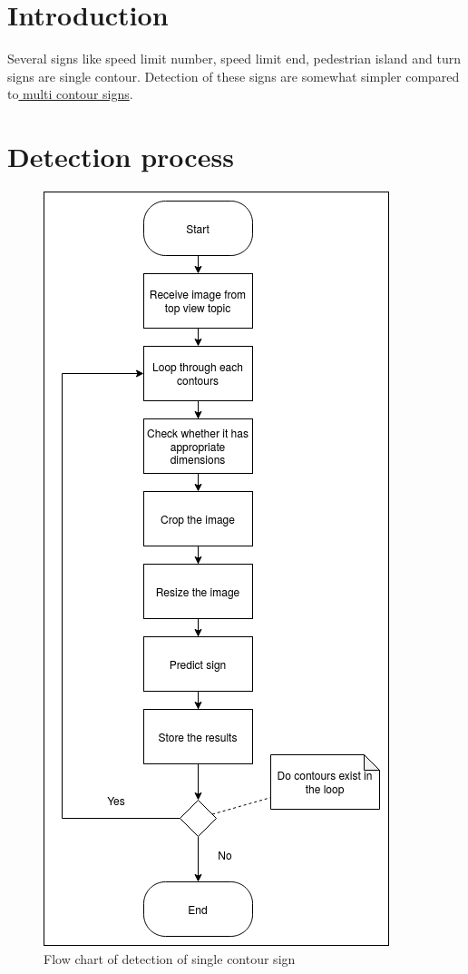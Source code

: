 \section{Introduction}
Several signs like speed limit number, speed limit end, pedestrian island and turn signs are single contour. Detection of these signs are somewhat simpler compared to\hyperref[chap:MultiContour]{ multi contour signs}.

\section{Detection process}
\begin{figure}[h]
    \centering
    \includegraphics[scale=0.40]{images/SIngleContourFlowDiagram.png}
    \caption{Flow chart of detection of single contour sign}
    \label{fig:SingleContourDetectionFlowChart}
\end{figure}

